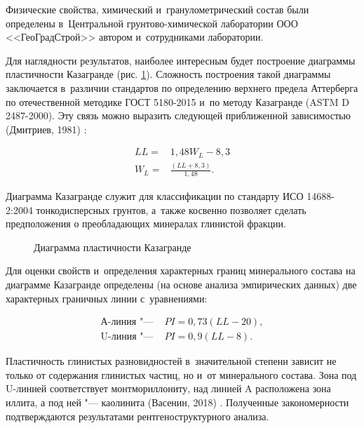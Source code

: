 Физические свойства, химический и~гранулометрический состав были определены в~Центральной грунтово-химической лаборатории ООО <<ГеоГрадСтрой>> автором и~сотрудниками лаборатории. 


Для наглядности результатов, наиболее интересным будет построение диаграммы пластичности Казагранде (рис. \ref{Fig:Caz}). 
Сложность построения такой диаграммы заключается в~различии стандартов по определению верхнего предела Аттерберга по отечественной методике ГОСТ 5180-2015 \cite{gost5180} и~по методу Казагранде (ASTM D 2487-2000). 
Эту связь можно выразить следующей приближенной зависимостью (Дмитриев, 1981) \cite{dmitriev1981}:

\begin{subequations}
    \label{eq:wlll}
    \begin{align}
        \label{eq:ll}
        LL = & 1,48W_L - 8,3 \\
        \label{eq:wl}
        W_L = & \frac{(LL + 8,3)}{1,48}.
    \end{align}
\end{subequations}


Диаграмма Казагранде служит для классификации по стандарту ИСО 14688-2:2004 тонкодисперсных грунтов, 
а~также косвенно позволяет сделать предположения о преобладающих минералах глинистой фракции. 

\begin{figure}[ht]
    \centering
    \small
    
    \caption{Диаграмма пластичности Казагранде}
    \label{Fig:Caz}
\end{figure}

Для оценки свойств и~определения характерных границ минерального состава на диаграмме Казагранде определены (на основе анализа эмпирических данных) две характерных граничных линии с~уравнениями:

\begin{subequations}
    \label{eq:au}
    \begin{align}
        \label{eq:a}
        \text{А-линия "--- } & PI = 0,73 (LL - 20),
        \\
        \label{eq:u}
        \text{U-линия "--- } & PI = 0,9 (LL - 8).
    \end{align}
\end{subequations}

Пластичность глинистых разновидностей в~значительной степени зависит не только от содержания глинистых частиц, но и~от минерального состава.
Зона под U-линией соответствует монтмориллониту, над линией A расположена зона иллита, а под ней "--- каолинита (Васенин, 2018) \cite{vasenin2018}.
Полученные закономерности подтверждаются результатами рентгеноструктурного анализа.


